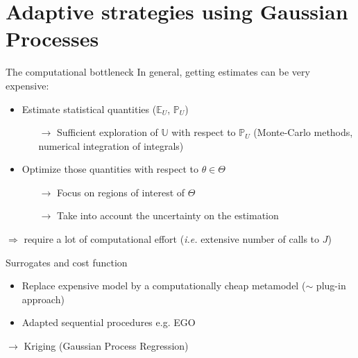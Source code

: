 \documentclass[10pt,aspectratio=169,usepdftitle=false]{beamer}
\newcommand{\Uspace}{\mathbb{U}}
\newcommand{\Kspace}{\Theta}
\newcommand{\Ex}{\mathbb{E}}
\newcommand{\Prob}{\mathbb{P}}
\newcommand{\kk}{\theta}
\newcommand{\UU}{U}
\begin{document}
\section{Adaptive strategies using Gaussian Processes}
\begin{frame}{The computational bottleneck}
  In general, getting estimates can be very expensive:
  \begin{itemize}
  \item \alert{Estimate} statistical quantities ($\Ex_{\UU}$, $\Prob_{\UU}$)
    \begin{itemize}
    \item[$\rightarrow$] Sufficient exploration of $\Uspace$ with
      respect to $\Prob_{\UU}$ (Monte-Carlo methods, numerical
      integration of integrals)
 \end{itemize}
\item \alert{Optimize} those quantities with respect to $\kk\in\Kspace$
  \begin{itemize}
  \item[$\rightarrow$] Focus on regions of interest of $\Kspace$
  \item[$\rightarrow$] Take into account the uncertainty on the estimation
  \end{itemize}
    \end{itemize}
  $\Rightarrow$ require a lot of computational effort (\emph{i.e.} extensive number of calls to $J$)
\end{frame}

\begin{frame}{Surrogates and cost function}

  
  \begin{itemize}
  \item Replace expensive model by a computationally cheap metamodel
    ($\sim$ plug-in approach)
  \item Adapted sequential procedures e.g. EGO
  \end{itemize}
  $\rightarrow$ Kriging (Gaussian Process Regression)~
\end{frame}
\end{document}
